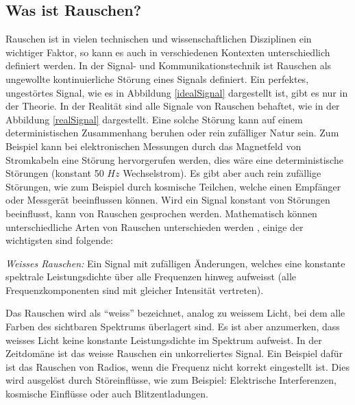 


\subsection{Was ist Rauschen?\label{brown:Rauschen:Arten}}

Rauschen ist in vielen technischen und wissenschaftlichen Disziplinen ein wichtiger Faktor, so kann es auch in verschiedenen Kontexten unterschiedlich definiert werden. In der Signal- und Kommunikationstechnik ist Rauschen als ungewollte kontinuierliche Störung eines Signals definiert. Ein perfektes, ungestörtes Signal, wie es in Abbildung \ref{idealSignal} dargestellt ist, gibt es nur in der Theorie. In der Realität sind alle Signale von Rauschen behaftet, wie in der Abbildung \ref{realSignal} dargestellt. Eine solche Störung kann auf einem deterministischen Zusammenhang beruhen oder rein zufälliger Natur sein. Zum Beispiel kann bei elektronischen Messungen durch das Magnetfeld von Stromkabeln eine Störung hervorgerufen werden, dies wäre eine deterministische Störungen (konstant 50 $ Hz $ Wechselstrom). Es gibt aber auch rein zufällige Störungen, wie zum Beispiel durch kosmische Teilchen, welche einen Empfänger oder Messgerät beeinflussen können. Wird ein Signal konstant von Störungen beeinflusst, kann von Rauschen gesprochen werden. Mathematisch können unterschiedliche Arten von Rauschen unterschieden werden \cite{werner2008signale}, einige der wichtigsten sind folgende: 


\begin{definition}
{\em Weisses Rauschen:}
Ein Signal mit zufälligen Änderungen, welches eine konstante spektrale Leistungsdichte über alle Frequenzen hinweg aufweisst (alle Frequenzkomponenten sind mit gleicher Intensität vertreten).
\end{definition}

Das Rauschen wird als ``weiss'' bezeichnet, analog zu weissem Licht, bei dem alle Farben des sichtbaren Spektrums überlagert sind. Es ist aber anzumerken, dass weisses Licht keine konstante Leistungsdichte im Spektrum aufweist. In der Zeitdomäne ist das weisse Rauschen ein unkorreliertes Signal. Ein Beispiel dafür ist das Rauschen von Radios, wenn die Frequenz nicht korrekt eingestellt ist. Dies wird ausgelöst durch Störeinflüsse, wie zum Beispiel: Elektrische Interferenzen, kosmische Einflüsse oder auch Blitzentladungen.


